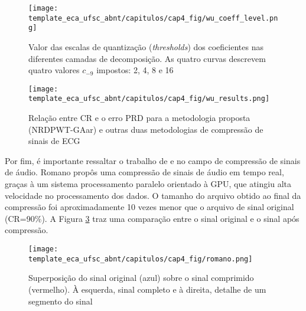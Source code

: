 \begin{figure}[htb]
	\caption{Valor das escalas de quantização (\textit{thresholds}) dos coeficientes nas diferentes camadas de decomposição. As quatro curvas descrevem quatro valores $c_{-9}$ impostos: 2, 4, 8 e 16}
	\begin{center}
		\texttt{[image: template\_eca\_ufsc\_abnt/capitulos/cap4\_fig/wu\_coeff\_level.png]}
	\end{center}
	\label{fig:wu_biomedic_wavelet_compress_genetic1}
\end{figure}

\begin{figure}[htb]
	\caption{Relação entre \gls{CR} e o erro \gls{PRD} para a metodologia proposta (\gls{NRDPWT}-GAar) e outras duas metodologias de compressão de sinais de \gls{ECG}}
	\begin{center}
		\texttt{[image: template\_eca\_ufsc\_abnt/capitulos/cap4\_fig/wu\_results.png]}
	\end{center}
	\label{fig:wu_biomedic_wavelet_compress_genetic2}
\end{figure}

Por fim, é importante ressaltar o trabalho de \cite{art:khalifa_audio_compress} e \cite{art:romano_audio_compress} no campo de compressão de sinais de áudio. Romano propôs uma compressão de sinais de áudio em tempo real, graças à um sistema processamento paralelo orientado à GPU, que atingiu alta velocidade no processamento dos dados. O tamanho do arquivo obtido ao final da compressão foi aproximadamente 10 vezes menor que o arquivo de sinal original (CR=90\%). A Figura \ref{fig:romano} traz uma comparação entre o sinal original e o sinal após compressão.


\begin{figure}[htb]
	\caption{Superposição do sinal original (azul) sobre o sinal comprimido (vermelho). À esquerda, sinal completo e à direita, detalhe de um segmento do sinal}
	\begin{center}
		\texttt{[image: template\_eca\_ufsc\_abnt/capitulos/cap4\_fig/romano.png]}
	\end{center}
	\label{fig:romano}
\end{figure}